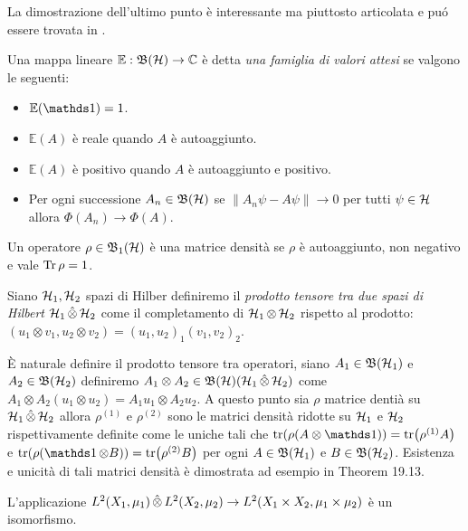 La dimostrazione dell'ultimo punto è interessante ma piuttosto articolata e puó essere trovata in \cite{Bir}. 


\begin{definition}
    Una mappa lineare $\mathbb{E}: \operatorname{\mathfrak{B}(\mathcal{H})} \to \mathbb{C}$ è detta \emph{ una famiglia di valori attesi} se valgono le seguenti:

\begin{itemize}
    \item $\mathbb{E}(\un) = 1$.
    \item $\mathbb{E}(A)$ è reale quando $A$ è autoaggiunto.
    \item $\mathbb{E}(A)$ è positivo quando $A$ è autoaggiunto e positivo.
    \item Per ogni successione $A_n \in \operatorname{\mathfrak{B}(\mathcal{H})}$ se $\| A_n\psi - A \psi\| \to 0$ per tutti $\psi \in \operatorname{\mathcal{H}}$ allora $\Phi(A_n) \to \Phi(A)$.
\end{itemize}
\end{definition}

\begin{definition}
    Un operatore $\rho\in \operatorname{\mathfrak{B}_1(\mathcal{H})}$ è una matrice densità se $\rho$ è autoaggiunto, non negativo e vale $\Tr \rho =1$.
\end{definition}

\begin{definition}
    Siano $\operatorname{\mathcal{H}}_1, \operatorname{\mathcal{H}}_2$ spazi di Hilber definiremo il \emph{prodotto tensore tra due spazi di Hilbert} $\operatorname{\mathcal{H}}_1 \hat{\otimes} \operatorname{\mathcal{H}}_2$ come il completamento di $\operatorname{\mathcal{H}}_1 \otimes \operatorname{\mathcal{H}}_2$ rispetto al prodotto:
$(u_1 \otimes v_1, u_2 \otimes v_2)= (u_1, u_2)_1 (v_1, v_2)_2$.
\end{definition}

È naturale definire il prodotto tensore tra operatori, siano $A_1 \in \mathfrak{B}(\operatorname{\mathcal{H}}_1)$ e $A_2 \in \mathfrak{B}(\operatorname{\mathcal{H}}_2)$ definiremo $A_1 \otimes A_2 \in \operatorname{\mathfrak{B}(\mathcal{H})}(\operatorname{\mathcal{H}}_1 \hat{\otimes} \operatorname{\mathcal{H}}_2)$ come $A_1 \otimes A_2(u_1 \otimes u_2) = A_1 u_1 \otimes A_2 u_2$.
A questo punto sia $\rho$ matrice dentià su $\operatorname{\mathcal{H}}_1 \operatorname{\hat{\otimes}} \operatorname{\mathcal{H}}_2$ allora $\rho^{(1)}$ e $\rho^{(2)}$ sono le matrici densità ridotte su $\operatorname{\mathcal{H}}_1$ e $\operatorname{\mathcal{H}}_2$ rispettivamente definite come le uniche tali che $\tr(\rho(A \otimes \un))= \tr(\rho^{(1)}A)$ e $\tr(\rho(\un \otimes B))= \tr(\rho^{(2)}B)$ per ogni $A \in \mathfrak{B}(\operatorname{\mathcal{H}}_1)$ e $B \in \mathfrak{B}(\operatorname{\mathcal{H}}_2)$. Esistenza e unicità di tali matrici densità è dimostrata ad esempio in \cite{Hall} Theorem 19.13.


\begin{proposition}
    L'applicazione $ L^2(X_1, \mu_1) \operatorname{\hat{\otimes}} L^2(X_2, \mu_2) \to L^2(X_1 \times X_2, \mu_1 \times \mu_2) $ è un isomorfismo.
\end{proposition}

